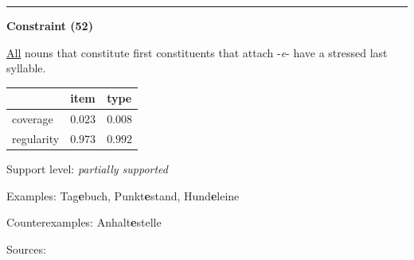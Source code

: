 \hrule




\vspace{0.4em}

\begin{center}
\textbf{Constraint (52)}
\end{center}

\noindent
\underline{All} nouns that constitute first constituents that attach -\textit{e}- have a stressed last syllable.
\vspace{0.35em}


\vspace{-0.35em}

\begin{table}[!ht]
\begin{center}

\begin{tabularx}{\columnwidth}{|X|X|X|}
\hline
 & item & type \\
\hline
 coverage & $0.023$ & $0.008$ \\
\hline
 regularity & $0.973$ & $0.992$ \\
\hline
\end{tabularx}
\end{center}
\end{table}

\vspace{-1.35em}

\noindent
Support level: \textit{partially supported}

\vspace{0.3em}

\noindent
Examples: Tag\textbf{e}buch, Punkt\textbf{e}stand, Hund\textbf{e}leine

\noindent
Counterexamples: Anhalt\textbf{e}stelle

\vspace{0.3em}

\noindent
Sources: \citet[9, 18]{kuerschner_2010}


